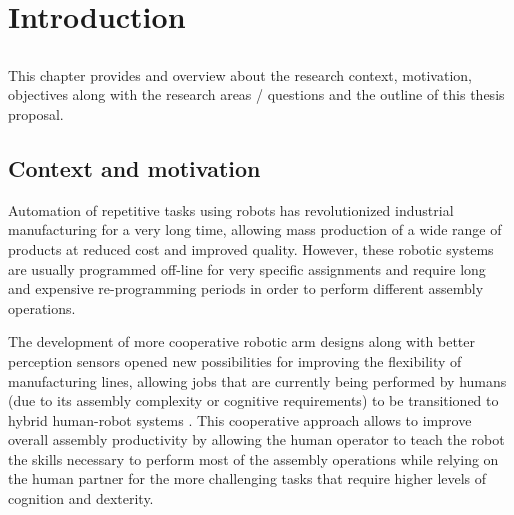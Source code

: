 \chapter{Introduction}\label{chap:introduction}



\section*{}

This chapter provides and overview about the research context, motivation, objectives along with the research areas / questions and the outline of this thesis proposal.



\section{Context and motivation}

Automation of repetitive tasks using robots has revolutionized industrial manufacturing for a very long time, allowing mass production of a wide range of products at reduced cost and improved quality. However, these robotic systems are usually programmed off-line for very specific assignments and require long and expensive re-programming periods in order to perform different assembly operations.

The development of more cooperative robotic arm designs along with better perception sensors opened new possibilities for improving the flexibility of manufacturing lines, allowing jobs that are currently being performed by humans (due to its assembly complexity or cognitive requirements) to be transitioned to hybrid human-robot systems \cite{Surdilovic2010}. This cooperative approach allows to improve overall assembly productivity by allowing the human operator to teach the robot the skills necessary to perform most of the assembly operations while relying on the human partner for the more challenging tasks that require higher levels of cognition and dexterity.


